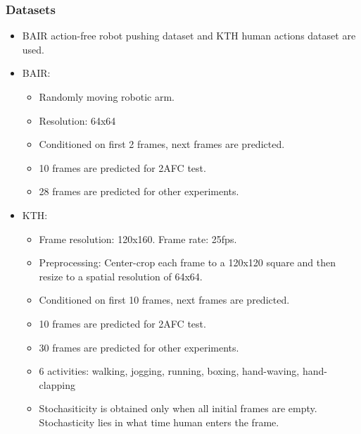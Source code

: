 \documentclass{article}
\begin{document}
    \subsubsection{Datasets}\label{subsubsec:Stochastic_Adversarial_Video_Prediction_(SAVP):datasets}
    \begin{itemize}
        \item BAIR action-free robot pushing dataset and KTH human actions dataset are used.
        \item BAIR:
        \begin{itemize}
            \item Randomly moving robotic arm.
            \item Resolution: 64x64
            \item Conditioned on first 2 frames, next frames are predicted.
            \item 10 frames are predicted for 2AFC test.
            \item 28 frames are predicted for other experiments.
        \end{itemize}
        \item KTH:
        \begin{itemize}
            \item Frame resolution: 120x160.
            Frame rate: 25fps.
            \item Preprocessing: Center-crop each frame to a 120x120 square and then resize to a spatial resolution of 64x64.
            \item Conditioned on first 10 frames, next frames are predicted.
            \item 10 frames are predicted for 2AFC test.
            \item 30 frames are predicted for other experiments.
            \item 6 activities: walking, jogging, running, boxing, hand-waving, hand-clapping
            \item Stochasiticity is obtained only when all initial frames are empty.
            Stochasticity lies in what time human enters the frame.
        \end{itemize}
    \end{itemize}
\end{document}
